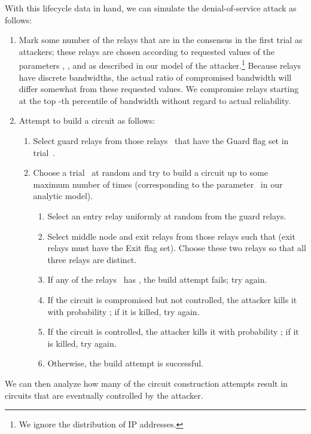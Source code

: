 \documentclass[]{lmcs}
\begin{document}
With this lifecycle data in hand, we can simulate the denial-of-service
attack as follows:
\begin{enumerate}
\item Mark some number of the relays that are in the consensus in the first
trial as attackers; these relays are chosen according to requested
values of the parameters
, , and  as described in our model of the attacker.\footnote{We ignore the distribution of IP addresses.}
Because relays have discrete bandwidths, the actual ratio of
compromised bandwidth will differ somewhat from these requested values.
We compromise relays starting at the top -th percentile of bandwidth
without regard to actual reliability.
\item Attempt to build a circuit as follows:
\begin{enumerate}
\item Select  guard relays from those relays~ that have the
Guard flag set in trial~.
\item Choose a trial~ at random and try to build a circuit up
to some maximum number of times (corresponding to the parameter~
in our analytic model).
\begin{enumerate}
\item Select an entry relay uniformly at random from the  guard relays.
\item Select middle node and exit relays from those relays 
such that  (exit relays must have the Exit flag
set).  Choose these two relays so that all three relays are distinct.
\item If any of the relays~ has , the build attempt fails;
try again.
\item If the circuit is compromised but not controlled, the
attacker kills it with probability ; if it is killed, try again.
\item If the circuit is controlled, the attacker kills it
with probability ; if it is killed, try again.
\item Otherwise, the build attempt is successful.
\end{enumerate}
\end{enumerate}
\end{enumerate}
We can then analyze how many of the circuit construction attempts
result in circuits that are eventually controlled by the attacker.
\end{document}
